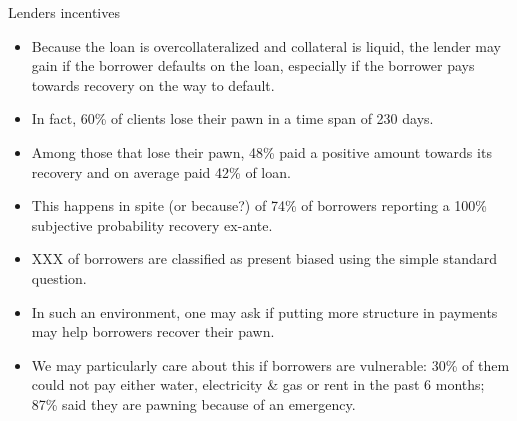 \documentclass[8pt]{beamer}
\begin{document}
\begin{frame}{Lenders incentives}
    \begin{itemize}
        \item Because the loan is overcollateralized and collateral is liquid, the lender may gain if the borrower defaults on the loan, especially if the borrower pays towards recovery on the way to default.
        \item In fact, 60\% of clients lose their pawn in a time span of 230 days.
        \item Among those that lose their pawn, 48\% paid a positive amount towards its recovery and on average paid 42\% of loan.
        \item This happens in spite (or because?) of 74\% of borrowers reporting a 100\% subjective probability recovery ex-ante. 
        \item XXX of borrowers are classified as present biased using the simple standard question.
        \item In such an environment, one may ask if putting more structure in payments may help borrowers recover their pawn.
        \item We may particularly care about this if borrowers are vulnerable: 30\% of them could not pay either water, electricity \& gas or rent in the past 6 months; 87\% said they are pawning because of an emergency.
    \end{itemize}
\end{frame}
\end{document}
